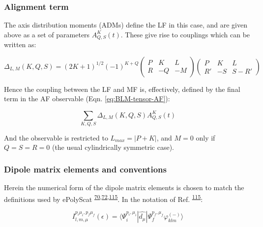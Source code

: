 \documentclass[10pt]{article}
\begin{document}
\subsubsection{Alignment term\label{alignment-term}}

The axis distribution moments (ADMs) define the LF in this case, and are given above as a set of parameters $A_{Q,S}^{K}(t)$. These give rise to couplings which can be written as:

\begin{equation}
\Delta_{L,M}(K,Q,S)=(2K+1)^{1/2}(-1)^{K+Q}\left(\begin{array}{ccc}
P & K & L\\
R & -Q & -M
\end{array}\right)\left(\begin{array}{ccc}
P & K & L\\
R' & -S & S-R'
\end{array}\right)
\label{eq:delta-func-defn}
\end{equation}

Hence the coupling between the LF and MF is, effectively, defined by the final term in the AF observable (Eqn. \ref{eq:BLM-tensor-AF}):

\begin{equation}
\sum_{K,Q,S}\Delta_{L,M}(K,Q,S)A_{Q,S}^{K}(t)
\end{equation}

And the observable is restricted to $L_{max}=|P+K|$, and $M=0$ only if  $Q=S=R=0$ (the usual cylindrically symmetric case).

\subsubsection{Dipole matrix elements and conventions\label{sec:mat-ele-conventions}}


Herein the numerical form of the dipole matrix elements is chosen to match the definitions used by ePolyScat \textsuperscript{\hyperref[csl:70]{70},\hyperref[csl:72]{72},\hyperref[csl:115]{115}}. In the notation of Ref. \textsuperscript{\hyperref[csl:115]{115}}:

\begin{equation}
I_{l,m,\mu}^{p_{i}\mu_{i},p_{f}\mu_{f}}(\epsilon)=\langle\Psi_{i}^{p_{i},\mu_{i}}|\hat{d_{\mu}}|\Psi_{f}^{p_{f},\mu_{f}}\varphi_{klm}^{(-)}\rangle\label{eq:eps-I}
\end{equation}
\end{document}
